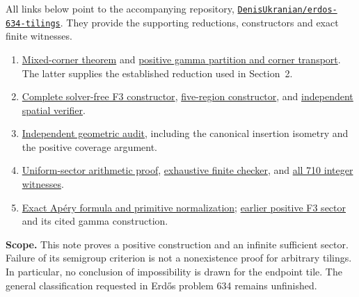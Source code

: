 \documentclass[11pt,a4paper]{article}
\newcommand{\repo}{https://github.com/DenisUkranian/erdos-634-tilings}
\newcommand{\base}{https://github.com/DenisUkranian/erdos-634-tilings/blob/main/research/}
\begin{document}
All links below point to the accompanying repository, \href{\repo}{\texttt{DenisUkranian/erdos-634-tilings}}. They provide the supporting reductions, constructors and exact finite witnesses.
\begin{enumerate}[leftmargin=*,itemsep=3pt,topsep=3pt,label={\arabic*.}]
\item \href{\base universal-closure-oct8/f3-general/MIXED_CORNER_THEOREM.md}{Mixed-corner theorem} and \href{\base universal-closure-oct8/f3-general/CORNER_REDUCTION.md}{positive gamma partition and corner transport}. The latter supplies the established reduction used in Section~2.
\item \href{\base universal-closure-oct8/f3-general/construct_f3_mixed.py}{Complete solver-free F3 constructor}, \href{\base universal-closure-oct8/f3-general/construct_mixed_corner.py}{five-region constructor}, and \href{\base group2-mixed-gamma/verify_spatial.py}{independent spatial verifier}.
\item \href{\base universal-closure-oct8/4830-position/GENERAL_CORNER_AUDIT.md}{Independent geometric audit}, including the canonical insertion isometry and the positive coverage argument.
\item \href{\base universal-closure-oct8/global/F3_UNIFORM_CONE.md}{Uniform-sector arithmetic proof}, \href{\base universal-closure-oct8/global/check_f3_uniform_cone.py}{exhaustive finite checker}, and \href{\base universal-closure-oct8/global/f3_uniform_cone_verified.json}{all 710 integer witnesses}.
\item \href{\base global-criterion-oct7/SHARP_NESTED_CONE.md}{Exact Ap\'ery formula and primitive normalization}; \href{\base best-move-oct7/hexagon/F3_SMALL_A.md}{earlier positive F3 sector} and its cited gamma construction.
\end{enumerate}

\textbf{Scope.} This note proves a positive construction and an infinite sufficient sector. Failure of its semigroup criterion is not a nonexistence proof for arbitrary tilings. In particular, no conclusion of impossibility is drawn for the endpoint tile. The general classification requested in Erd\H{o}s problem 634 remains unfinished.
\end{document}
